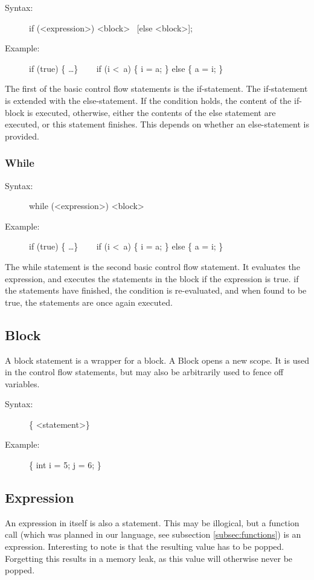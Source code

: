 \documentclass[10pt,a4paper]{report}
\begin{document}
\begin{description}
	\item[Syntax:] 
		if (\textless expression\textgreater ) \textless block\textgreater ~ [else \textless block\textgreater ];
	\item[Example:] 
		if (true) \{ \ldots \} ~~~
		if (i \textless ~a) \{ i = a; \} else \{ a = i; \}
\end{description} 

The first of the basic control flow statements is the if-statement. The if-statement is extended with the else-statement. If the condition holds, the content of the if-block is executed, otherwise, either the contents of the else statement are executed, or this statement finishes. This depends on whether an else-statement is provided.


\subsubsection*{While}

\begin{description}
	\item[Syntax:] 
		while (\textless expression\textgreater ) \textless block\textgreater
	\item[Example:] 
		if (true) \{ \ldots \} ~~~
		if (i \textless ~a) \{ i = a; \} else \{ a = i; \}
\end{description} 
The while statement is the second basic control flow statement. It evaluates the expression, and executes the statements in the block if the expression is true. if the statements have finished, the condition is re-evaluated, and when found to be true, the statements are once again executed.


\subsection{Block}
A block statement is a wrapper for a block. A Block opens a new scope. It is used in the control flow statements, but may also be arbitrarily used to fence off variables.

\begin{description}
	\item[Syntax:] 
		\{ \textless statement\textgreater * \}
	\item[Example:] 
		\{ int i = 5; j = 6; \}
\end{description} 

\subsection{Expression}
An expression in itself is also a statement. This may be illogical, but a function call (which was planned in our language, see subsection \ref{subsec:functions}) is an expression. Interesting to note is that the resulting value has to be popped. Forgetting this results in a memory leak, as this value will otherwise never be popped.
\end{document}
